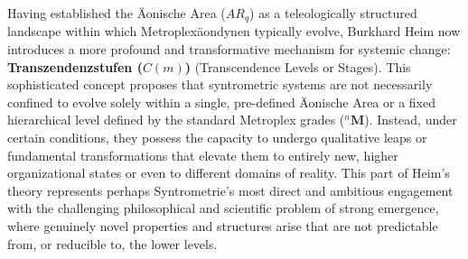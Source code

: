 \documentclass[12pt]{article}
\newcommand{\metroplex}[1]{{}^{#1}\mathbf{M}}
\newcommand{\aeonischearea}{AR_q}
\newcommand{\transzendenzstufe}[1]{C(#1)}
\begin{document}
Having established the Äonische Area (\(\aeonischearea\)) as a teleologically structured landscape within which Metroplexäondynen typically evolve, Burkhard Heim now introduces a more profound and transformative mechanism for systemic change: \textbf{Transzendenzstufen (\(\transzendenzstufe{m}\))} (Transcendence Levels or Stages). This sophisticated concept proposes that syntrometric systems are not necessarily confined to evolve solely within a single, pre-defined Äonische Area or a fixed hierarchical level defined by the standard Metroplex grades (\( \metroplex{n} \)). Instead, under certain conditions, they possess the capacity to undergo qualitative leaps or fundamental transformations that elevate them to entirely new, higher organizational states or even to different domains of reality. This part of Heim's theory represents perhaps Syntrometrie’s most direct and ambitious engagement with the challenging philosophical and scientific problem of strong emergence, where genuinely novel properties and structures arise that are not predictable from, or reducible to, the lower levels.
\end{document}
